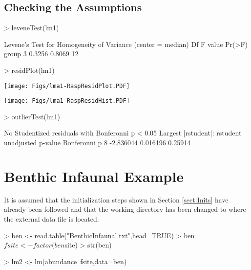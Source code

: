 \documentclass[a4paper]{article}
\begin{document}
\subsection{Checking the Assumptions}
\begin{Schunk}
\begin{Sinput}
> leveneTest(lm1)
\end{Sinput}
\begin{Soutput}
Levene's Test for Homogeneity of Variance (center = median)
      Df F value Pr(>F)
group  3  0.3256 0.8069
      12               
\end{Soutput}
\begin{Sinput}
> residPlot(lm1)
\end{Sinput}
\end{Schunk}
\texttt{[image: Figs/lma1-RaspResidPlot.PDF]}

\begin{Schunk}
\end{Schunk}
\texttt{[image: Figs/lma1-RaspResidHist.PDF]}

\begin{Schunk}
\begin{Sinput}
> outlierTest(lm1)
\end{Sinput}
\begin{Soutput}
No Studentized residuals with Bonferonni p < 0.05
Largest |rstudent|:
   rstudent unadjusted p-value Bonferonni p
8 -2.836044           0.016196      0.25914
\end{Soutput}
\end{Schunk}

\newpage
\section{Benthic Infaunal Example}
It is assumed that the initialization steps shown in Section \ref{sect:Inits} have already been followed and that the working directory has been changed to where the external data file is located.
\begin{Schunk}
\begin{Sinput}
> ben <- read.table("BenthicInfaunal.txt",head=TRUE)
> ben$fsite <- factor(ben$site)
> str(ben)
\end{Sinput}
\begin{Sinput}
> lm2 <- lm(abundance~fsite,data=ben)
\end{Sinput}
\end{Schunk}
\end{document}
